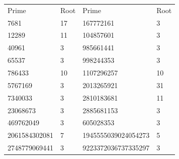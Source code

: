 \begin{tabular}{ l l l l }
		Prime & Root & Prime & Root \\
		7681  &   17 & 167772161 & 3 \\
		12289 & 11 & 104857601 & 3 \\
		40961 & 3 & 985661441 & 3 \\
		65537 & 3 & 998244353 & 3 \\   
		786433 & 10 & 1107296257 & 10 \\
		5767169 & 3 & 2013265921 & 31 \\
		7340033 & 3 & 2810183681 & 11 \\
		23068673 & 3 & 2885681153 & 3 \\
		469762049 & 3 & 605028353 & 3 \\
		2061584302081 & 7 & 1945555039024054273 & 5 \\
		2748779069441 & 3 & 9223372036737335297 & 3
\end{tabular}